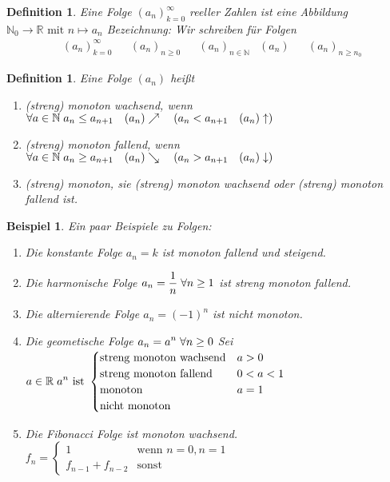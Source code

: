 \documentclass[a4paper,titlepage,oneside]{article}
\def\N{\ensuremath{\mathbb{N}} }
\def\R{\ensuremath{\mathbb{R}} }
\def\fa{\ensuremath{\forall}}
\def\sp{\hspace{0,1cm}}
\theoremstyle{thmstyle}
\newtheorem{defi}[satz]{Definition}
\newtheorem{bsp}[satz]{Beispiel}
\begin{document}
\begin{defi}
Eine Folge $(a_n)_{k=0}^{\infty}$ reeller Zahlen ist eine Abbildung $\N_0 \rightarrow \R\text{ mit } n \mapsto a_n$
Bezeichnung: Wir schreiben für Folgen
\begin{align*}
&(a_n)_{k=0}^{\infty} && (a_n)_{n\ge0} && (a_n)_{n\in\N} & (a_n) && (a_n)_{n\ge n_0}
\end{align*}
\end{defi}

\newpage
\begin{defi}
Eine Folge \((a_n)\) heißt
\begin{enumerate}
\item (streng) monoton wachsend, wenn \( \fa a \in \N \sp a_n \le a_{n+1}	\quad (a_n)\nearrow	\quad (a_n < a_{n+1} \quad (a_n)\uparrow)\)
\item (streng) monoton fallend, wenn \( \fa a \in \N \sp a_n \ge a_{n+1}	\quad (a_n)\searrow	\quad (a_n > a_{n+1} \quad (a_n)\downarrow)\)
\item (streng) monoton, sie (streng) monoton wachsend oder (streng) monoton fallend ist.
\end{enumerate}
\end{defi}

\begin{bsp}
Ein paar Beispiele zu Folgen:
\begin{enumerate}[label=(\arabic*)]
\item Die konstante Folge \(a_n = k\) ist monoton fallend und steigend.
\item Die harmonische Folge $ \displaystyle a_n = \frac{1}{n} \sp \fa n \ge 1$ ist streng monoton fallend.
\item Die alternierende Folge $ \displaystyle a_n = (-1)^n $ ist nicht monoton.
\item Die geometische Folge $ \displaystyle  a_n = a^n \sp \fa n \ge 0 $ Sei $ \displaystyle a \in \R \sp a^n \text{ ist }
				\begin{cases}			\text{streng monoton wachsend} 	& a > 0\\
									\text{streng monoton fallend} 		& 0 < a < 1\\
									\text{monoton} 					& a = 1\\
									\text{nicht monoton} 				&  \end{cases} $
\item Die Fibonacci Folge ist monoton wachsend. $ \displaystyle f_n = \begin{cases}	1				& \text{wenn } n = 0, n = 1\\
																f_{n-1} + f_{n-2}	& \text{sonst} \end{cases} $
\end{enumerate}
\end{bsp}
\end{document}
